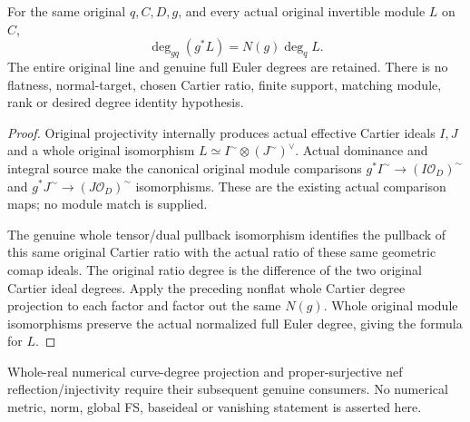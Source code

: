 \begin{theorem}
\label{thm:intrinsic-numerical-nonflat-whole-line-degree}
\leanok
For the same original $q,C,D,g$, and every actual original invertible
module $L$ on $C$,
\[
 \deg_{gq}(g^*L)=N(g)\deg_q L.
\]
The entire original line and genuine full Euler degrees are retained.
There is no flatness, normal-target, chosen Cartier ratio, finite support,
matching module, rank or desired degree identity hypothesis.
\end{theorem}
\begin{proof}
Original projectivity internally produces actual effective Cartier
ideals $I,J$ and a whole original isomorphism $L\simeq I^{\sim}\otimes
(J^{\sim})^\vee$. Actual dominance and integral source make the
canonical original module comparisons
$g^*I^{\sim}\to(I\mathcal O_D)^{\sim}$ and
$g^*J^{\sim}\to(J\mathcal O_D)^{\sim}$ isomorphisms. These are the
existing actual comparison maps; no module match is supplied.

The genuine whole tensor/dual pullback isomorphism identifies the
pullback of this same original Cartier ratio with the actual ratio of
these same geometric comap ideals. The original ratio degree is the
difference of the two original Cartier ideal degrees. Apply the
preceding nonflat whole Cartier degree projection to each factor and
factor out the same $N(g)$. Whole original module isomorphisms preserve
the actual normalized full Euler degree, giving the formula for $L$.
\end{proof}

Whole-real numerical curve-degree projection and proper-surjective nef
reflection/injectivity require their subsequent genuine consumers. No
numerical metric, norm, global FS, baseideal or vanishing statement is
asserted here.

